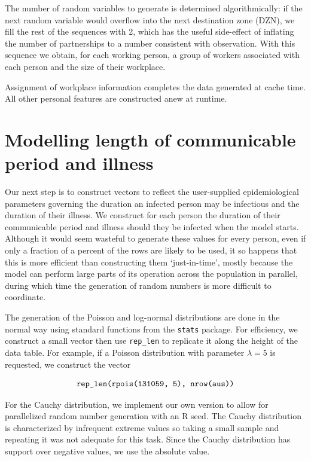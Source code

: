 \documentclass[submission]{grattan}
\newcommand*{\code}[1]{\texttt{#1}}
\begin{document}
The number of random variables to generate is determined algorithmically: if the next random variable
would overflow into the next destination zone (DZN), we fill the rest of the sequences with 2, which has the useful
side-effect of inflating the number of partnerships to a number consistent with observation.
With this sequence we obtain, for each working person, a group of workers associated with each person
and the size of their workplace.

Assignment of workplace information completes the data generated at cache time. All other personal
features are constructed anew at runtime.

\section{Modelling length of communicable period and illness}

Our next step is to construct vectors to reflect the user-supplied epidemiological parameters
governing the duration an infected person may be infectious and the duration of their illness.
We construct for each person the duration of their communicable period and illness should they
be infected when the model starts. Although it would seem wasteful to generate these values
for every person, even if only a fraction of a percent of the rows are likely to be used, it
so happens that this is more efficient than constructing them `just-in-time', mostly because
the model can perform large parts of its operation across the population in parallel, during
which time the generation of random numbers is more difficult to coordinate.

The generation of the Poisson and log-normal distributions are done in the normal way using
 standard functions from the \code{stats} package.  For efficiency, we construct a small vector
 then use \code{rep\_len} to replicate it along the height of the data table. For example, if
 a Poisson distribution with parameter \(\lambda = 5\) is requested, we construct the vector

\[\text{\code{rep\_len(rpois(131059, 5), nrow(aus))}} \]

 For the Cauchy distribution, we implement our own version to allow for parallelized random
 number generation with an R seed. The Cauchy distribution is characterized by infrequent
 extreme values so taking a small sample and repeating it was not adequate for this task.
 Since the Cauchy distribution has support over negative values,
 we use the absolute value.
\end{document}
